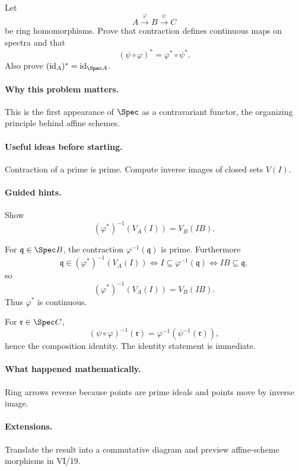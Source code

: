 \begin{problem}
Let
\[
A\xrightarrow{\varphi}B\xrightarrow{\psi}C
\]
be ring homomorphisms.  Prove that contraction defines continuous maps on spectra and that
\[
(\psi\circ\varphi)^\ast=\varphi^\ast\circ\psi^\ast.
\]
Also prove $(\operatorname{id}_A)^\ast=\operatorname{id}_{\Spec A}$.
\end{problem}

\paragraph{Why this problem matters.}
This is the first appearance of $\Spec$ as a contravariant functor, the organizing principle
behind affine schemes.

\paragraph{Useful ideas before starting.}
Contraction of a prime is prime.  Compute inverse images of closed sets $V(I)$.

\paragraph{Guided hints.}
Show
\[
(\varphi^\ast)^{-1}(V_A(I))=V_B(IB).
\]

\begin{solution}
For $\mathfrak q\in\Spec B$, the contraction $\varphi^{-1}(\mathfrak q)$ is prime.
Furthermore
\[
\mathfrak q\in(\varphi^\ast)^{-1}(V_A(I))
\iff
I\subseteq\varphi^{-1}(\mathfrak q)
\iff
IB\subseteq\mathfrak q,
\]
so
\[
(\varphi^\ast)^{-1}(V_A(I))=V_B(IB).
\]
Thus $\varphi^\ast$ is continuous.

For $\mathfrak r\in\Spec C$,
\[
(\psi\circ\varphi)^{-1}(\mathfrak r)
=
\varphi^{-1}(\psi^{-1}(\mathfrak r)),
\]
hence the composition identity.  The identity statement is immediate.
\end{solution}

\paragraph{What happened mathematically.}
Ring arrows reverse because points are prime ideals and points move by inverse image.

\paragraph{Extensions.}
Translate the result into a commutative diagram and preview affine-scheme morphisms in VI/19.
